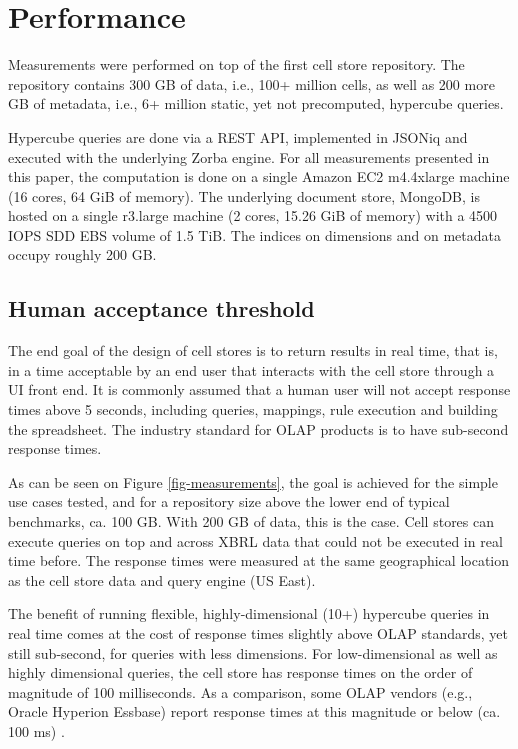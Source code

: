 \documentclass{acm_proc_article-sp}
\begin{document}
\section{Performance}
\label{section-performance}
Measurements were performed on top of the first cell store repository. The repository contains 300 GB of data, i.e., 100+ million cells, as well as 200 more GB of metadata, i.e., 6+ million static, yet not precomputed, hypercube queries.

Hypercube queries are done via a REST API, implemented in JSONiq and executed with the underlying Zorba engine. For all measurements presented in this paper, the computation is done on a single Amazon EC2 m4.4xlarge machine (16 cores, 64 GiB of memory). The underlying document store, MongoDB, is hosted on a single r3.large machine (2 cores, 15.26 GiB of memory) with a 4500 IOPS SDD EBS volume of 1.5 TiB. The indices on dimensions and on metadata occupy roughly 200 GB.

\subsection{Human acceptance threshold}

The end goal of the design of cell stores is to return results in real time, that is, in a time acceptable by an end user that interacts with the cell store through a UI front end. It is commonly assumed that a human user will not accept response times above 5 seconds, including queries, mappings, rule execution and building the spreadsheet. The industry standard for OLAP products is to have sub-second response times.

As can be seen on Figure \ref{fig-measurements}, the goal is achieved for the simple use cases tested, and for a repository size above the lower end of typical benchmarks, ca. 100 GB. With 200 GB of data, this is the case. Cell stores can execute queries on top and across XBRL data that could not be executed in real time before. The response times were measured at the same geographical location as the cell store data and query engine (US East). 

The benefit of running flexible, highly-dimensional (10+) hypercube queries in real time comes at the cost of response times slightly above OLAP standards, yet still sub-second, for queries with less dimensions. For low-dimensional as well as highly dimensional queries, the cell store has response times on the order of magnitude of 100 milliseconds. As a comparison, some OLAP vendors (e.g., Oracle Hyperion Essbase) report response times at this magnitude or below (ca. 100 ms) \cite{Hyperion2013}.
\end{document}
